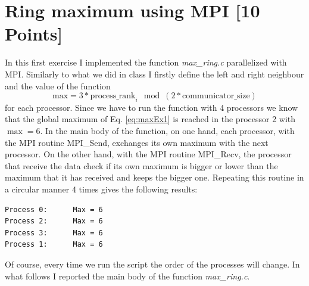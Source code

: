 \documentclass[unicode,11pt,a4paper,oneside,numbers=endperiod,openany]{scrartcl}
\begin{document}
\setassignment
{}

\newline

\assignmentpolicy

\section{Ring maximum using MPI [10 Points]}
In this first exercise I implemented the function \textit{max\_ring.c} parallelized with MPI. Similarly to what we did in class I firstly define the left and right neighbour and the value of the function  
\begin{equation}\label{eq:maxEx1}
	\text{max} = 3 * \text{process\_rank}_i \mod(2 * \text{communicator\_size}) 
\end{equation}
for each processor. Since we have to run the function with 4 processors we know that the global maximum of Eq. \ref{eq:maxEx1} is reached in the processor 2 with $\max = 6$. In the main body of the function, on one hand, each processor, with the MPI routine MPI\_Send, exchanges its own maximum with the next processor. On the other hand, with the MPI routine MPI\_Recv, the processor that receive the data check if its own maximum is bigger or lower than the maximum that it has received and keeps the bigger one. Repeating this routine in a circular manner 4 times gives the following results:

\begin{lstlisting}[language = bash, backgroundcolor=\color{gray!20}]
Process 0:		Max = 6
Process 2:		Max = 6
Process 3:		Max = 6
Process 1:		Max = 6
\end{lstlisting}
 Of course, every time we run the script the order of the processes will change. In what follows I reported the main body of the function \textit{max\_ring.c}.


\end{document}
